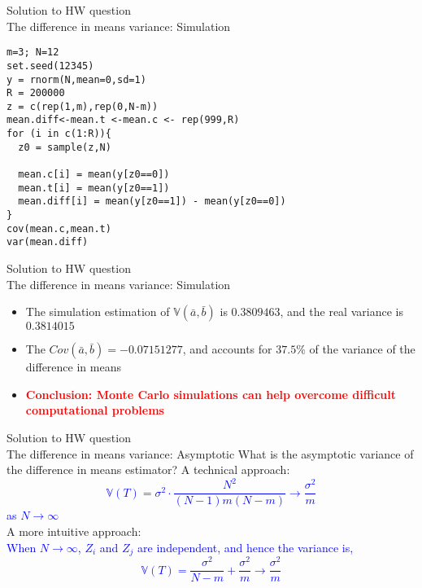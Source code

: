 \documentclass{beamer}
\theoremstyle{definition}
\begin{document}
\begin{frame}[fragile]{Solution to HW question \\ 
The difference in means variance: Simulation}
\begin{verbatim}
m=3; N=12
set.seed(12345)
y = rnorm(N,mean=0,sd=1)
R = 200000
z = c(rep(1,m),rep(0,N-m))
mean.diff<-mean.t <-mean.c <- rep(999,R)
for (i in c(1:R)){
  z0 = sample(z,N)
  
  mean.c[i] = mean(y[z0==0])
  mean.t[i] = mean(y[z0==1])
  mean.diff[i] = mean(y[z0==1]) - mean(y[z0==0])
}
cov(mean.c,mean.t)
var(mean.diff)
\end{verbatim}
\end{frame}

\begin{frame}[fragile]{Solution to HW question \\ 
The difference in means variance: Simulation}
\begin{itemize}
\item The simulation estimation of $\mathbb{V}(\bar{a},\bar{b})$ is $0.3809463$, and the real variance is $0.3814015$
\pause
\item The $Cov(\bar{a},\bar{b}) = -0.07151277$, and accounts for $37.5\%$ of the variance of the difference in means
\pause
\item \textcolor{red}{\textbf{Conclusion: Monte Carlo simulations can help overcome difficult computational problems}}  
\end{itemize}
\end{frame}

\begin{frame}[fragile]{Solution to HW question \\ 
The difference in means variance: Asymptotic}
What is the asymptotic variance of the difference in means estimator?  \pause
A technical approach: 
\textcolor{blue}{
$$\mathbb{V}(T) = \sigma^2 \cdot  \frac{N^2}{(N-1)m(N-m)} \rightarrow  \frac{\sigma^2}{m}$$
as $N \rightarrow \infty$ \\
}
\pause 
A more intuitive approach: \\
\textcolor{blue}{
When $N\rightarrow \infty$, $Z_i$ and $Z_j$ are independent, and hence the variance is,
$$\mathbb{V}(T) = \frac{\sigma^2}{N-m} + \frac{\sigma^2}{m} \rightarrow \frac{\sigma^2}{m}$$ 
}
\end{frame}












\end{document}

